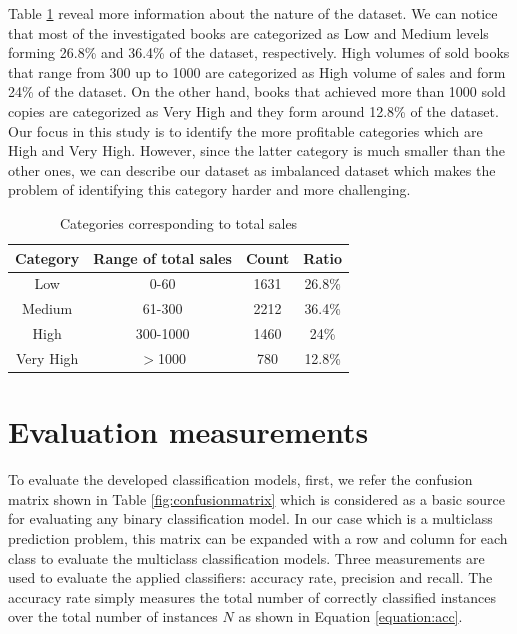 \documentclass[a4paper,10pt,twocolumn,preprint,3p]{elsarticle}
\begin{document}
Table \ref{table:freq} reveal more information about the nature of the dataset. We can notice that most of the investigated books are categorized as Low and Medium levels forming 26.8\% and 36.4\% of the dataset, respectively. High volumes of sold books that range from 300 up to 1000 are categorized as High volume of sales and form 24\% of the dataset. On the other hand, books that achieved more than 1000 sold copies are categorized as Very High and they form around 12.8\% of the dataset. Our focus in this study is to identify the more profitable categories which are High and Very High. However, since the latter category is much smaller than the other ones, we can describe our dataset as imbalanced dataset which makes the problem of identifying this category harder and more challenging.





\begin{table}[ht]
\caption{Categories corresponding to total sales }
\centering{}%
\begin{tabular}{|c|c|c|c|}
\hline 
Category & Range of total sales & Count & Ratio\tabularnewline
\hline 
\hline 
Low & 0-60 & 1631 & 26.8\%\tabularnewline
\hline 
Medium & 61-300 & 2212 & 36.4\%\tabularnewline
\hline 
High & 300-1000 & 1460 & 24\%\tabularnewline
\hline 
Very High & $>$1000 & 780 & 12.8\%\tabularnewline
\hline 
\end{tabular}
\label{table:freq}
\end{table}


\section{Evaluation measurements}
\label{sec:eval_measures}

To evaluate the developed classification models, first, we refer the confusion matrix shown in Table \ref{fig:confusionmatrix} which is considered as a basic source for evaluating any binary classification model. In our case which is a multiclass prediction problem, this matrix can be expanded with a row and column for each class to evaluate the multiclass classification models. Three measurements are used to evaluate the applied classifiers: accuracy rate, precision and recall. The accuracy rate simply measures the total number of correctly classified instances over the total number of instances $N$ as shown in Equation \ref{equation:acc}.
\end{document}
